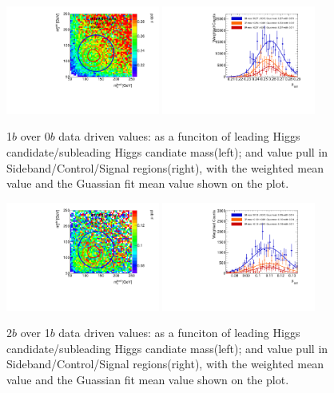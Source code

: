 \begin{figure}[htbp!]
\begin{center}
\includegraphics[width=0.45\textwidth,angle=-90]{figures/boosted/AppendixMuqcdstudy/OneTag_Incl_mH0H1.pdf}
\includegraphics[width=0.45\textwidth,angle=-90]{figures/boosted/AppendixMuqcdstudy/OneTag_Incl_mH0H1_pull.pdf}
\caption{1$b$ over 0$b$ data driven \muqcd values: \muqcd as a funciton of leading Higgs candidate/subleading Higgs candiate mass(left); and \muqcd value pull in Sideband/Control/Signal regions(right), with the weighted mean value and the Guassian fit mean value shown on the plot.}
\label{fig:app-muqcd-1b}
\end{center}
\end{figure}

\begin{figure}[htbp!]
\begin{center}
\includegraphics[width=0.45\textwidth,angle=-90]{figures/boosted/AppendixMuqcdstudy/TwoTag_Incl_mH0H1.pdf}
\includegraphics[width=0.45\textwidth,angle=-90]{figures/boosted/AppendixMuqcdstudy/TwoTag_Incl_mH0H1_pull.pdf}
\caption{2$b$ over 1$b$ data driven \muqcd values: \muqcd as a funciton of leading Higgs candidate/subleading Higgs candiate mass(left); and \muqcd value pull in Sideband/Control/Signal regions(right), with the weighted mean value and the Guassian fit mean value shown on the plot.}
\label{fig:app-muqcd-2b}
\end{center}
\end{figure}

